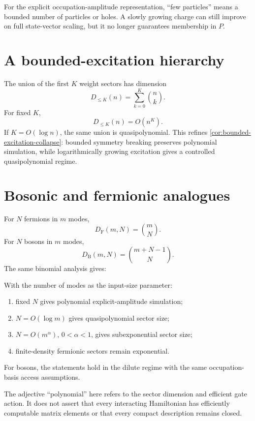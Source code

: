 \begin{derivedbox}
For the explicit occupation-amplitude representation, ``few particles'' means a bounded number of particles or holes. A slowly growing charge can still improve on full state-vector scaling, but it no longer guarantees membership in $P$.
\end{derivedbox}

\section{A bounded-excitation hierarchy}
The union of the first $K$ weight sectors has dimension
\[
D_{\le K}(n)
=
\sum_{k=0}^{K}\binom nk.
\]
For fixed $K$,
\[
D_{\le K}(n)=O(n^K).
\]
If $K=O(\log n)$, the same union is quasipolynomial. This refines \cref{cor:bounded-excitation-collapse}: bounded symmetry breaking preserves polynomial simulation, while logarithmically growing excitation gives a controlled quasipolynomial regime.

\section{Bosonic and fermionic analogues}
For $N$ fermions in $m$ modes,
\[
D_{\mathrm F}(m,N)=\binom mN.
\]
For $N$ bosons in $m$ modes,
\[
D_{\mathrm B}(m,N)=\binom{m+N-1}{N}.
\]
The same binomial analysis gives:

\begin{corollary}
\label{cor:few-particle-scaling}
With the number of modes as the input-size parameter:
\begin{enumerate}
\item fixed $N$ gives polynomial explicit-amplitude simulation;
\item $N=O(\log m)$ gives quasipolynomial sector size;
\item $N=O(m^\alpha)$, $0<\alpha<1$, gives subexponential sector size;
\item finite-density fermionic sectors remain exponential.
\end{enumerate}
For bosons, the statements hold in the dilute regime with the same occupation-basis access assumptions.
\end{corollary}

The adjective ``polynomial'' here refers to the sector dimension and efficient gate action. It does not assert that every interacting Hamiltonian has efficiently computable matrix elements or that every compact description remains closed.

